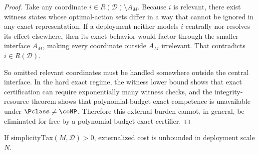 \begin{proof}
Take any coordinate $i\in R(\mathcal{D})\setminus A_M$. Because $i$ is relevant, there exist witness states whose optimal-action sets differ in a way that cannot be ignored in any exact representation. If a deployment neither models $i$ centrally nor resolves its effect elsewhere, then its exact behavior would factor through the smaller interface $A_M$, making every coordinate outside $A_M$ irrelevant. That contradicts $i\in R(\mathcal{D})$.

So omitted relevant coordinates must be handled somewhere outside the central interface. In the hard exact regime, the witness lower bound shows that exact certification can require exponentially many witness checks, and the integrity-resource theorem shows that polynomial-budget exact competence is unavailable under $\Pclass\neq\coNP$. Therefore this external burden cannot, in general, be eliminated for free by a polynomial-budget exact certifier.
\end{proof}

\begin{corollary}
If $\mathrm{simplicityTax}(M,\mathcal{D})>0$, externalized cost is unbounded in deployment scale $N$.
\end{corollary}
